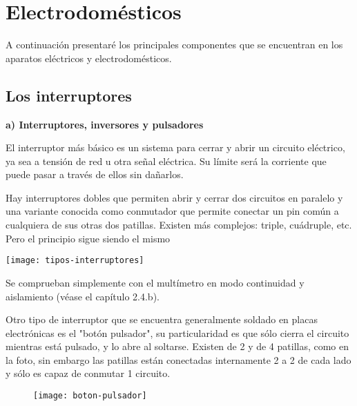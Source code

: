 \chapter{Electrodomésticos}
A continuación presentaré los principales componentes que se encuentran en los aparatos eléctricos y electrodomésticos.

\section{Los interruptores}
{\large \textbf{a) Interruptores, inversores y pulsadores}}\\

\noindent\begin{minipage}[t]{0.35\textwidth}\vspace{0pt}

El interruptor más básico es un sistema para cerrar y abrir un
circuito eléctrico, ya sea a tensión de red u otra señal eléctrica.
Su límite será la corriente que puede pasar a través de ellos sin
dañarlos.\\

\begin{flushleft}
Hay interruptores dobles que permiten abrir y cerrar dos circuitos
en paralelo y una variante conocida como conmutador que permite conectar un pin común a
cualquiera de sus otras dos patillas. Existen más complejos: triple,
cuádruple, etc. Pero el principio sigue siendo el mismo
\end{flushleft}
\end{minipage}%
\hfill%
\begin{minipage}[t]{0.6\textwidth}\vspace{0pt}
\texttt{[image: tipos-interruptores]}
\end{minipage}
\vspace{1em}

Se comprueban simplemente con el multímetro en modo continuidad y aislamiento
(véase el capítulo 2.4.b).
\newpage

Otro tipo de interruptor que se encuentra generalmente soldado en placas electrónicas es el "botón pulsador", su particularidad es que sólo cierra el circuito mientras está pulsado, y lo abre al soltarse.
Existen de 2 y de 4 patillas, como en la foto, sin embargo las patillas están conectadas internamente 2 a 2 de cada lado y sólo es capaz de conmutar 1 circuito.

\begin{figure}[h]
\texttt{[image: boton-pulsador]}
\centering
\end{figure}

